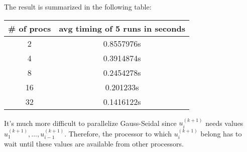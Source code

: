 \documentclass[12pt]{article}
\begin{document}
\noindent
The result is summarized in the following table:

\begin{center}
  \begin{tabular}{ | c | c | }
    \hline
    \# of procs & avg timing of 5 runs in seconds  \\ \hline
    2  & 0.8557976s  \\ \hline
    4  & 0.3914874s \\ \hline
    8  & 0.2454278s  \\ \hline
    16 & 0.201233s \\ \hline
    32 & 0.1416122s \\
    \hline
  \end{tabular}
\end{center}
It's much more difficult to parallelize Gauss-Seidal since $u_i^{(k+1)}$ needs values  $u_1^{(k+1)}, \dots, u_{i-1}^{(k+1)}$. Therefore, the processor to which $u_i^{(k+1)}$ belong has to wait until these values are available from other processors.
\end{document}
